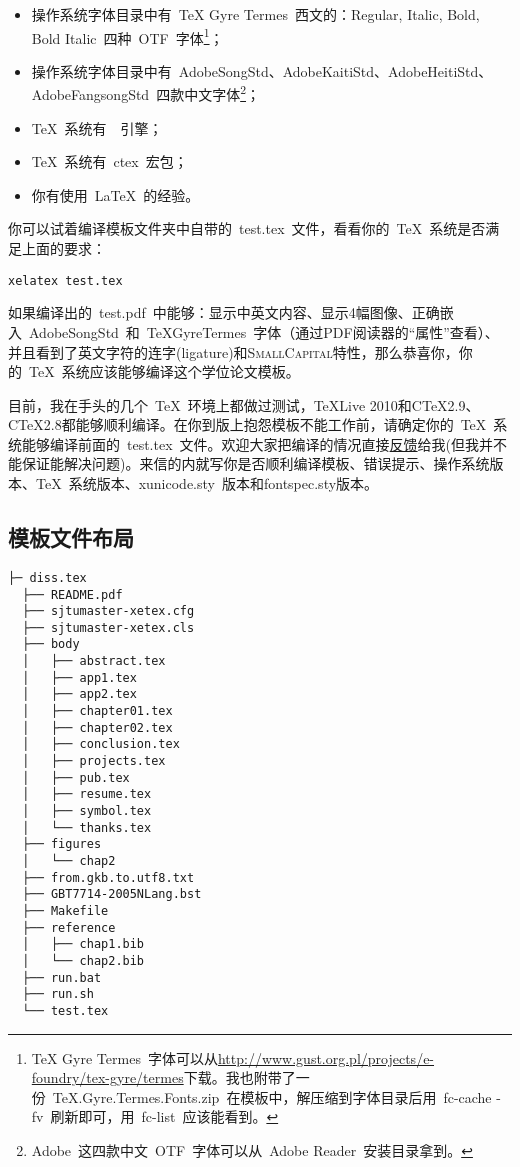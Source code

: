 \begin{itemize}
\item 操作系统字体目录中有~TeX Gyre Termes~西文的：Regular, Italic, Bold, Bold Italic~四种~OTF~字体\footnote{TeX Gyre Termes~字体可以从\href{http://www.gust.org.pl/projects/e-foundry/tex-gyre/termes}{http://www.gust.org.pl/projects/e-foundry/tex-gyre/termes}下载。我也附带了一份~TeX.Gyre.Termes.Fonts.zip~在模板中，解压缩到字体目录后用~fc-cache -fv~刷新即可，用~fc-list~应该能看到。}；
\item 操作系统字体目录中有~AdobeSongStd、AdobeKaitiStd、AdobeHeitiStd、AdobeFangsongStd~四款中文字体\footnote{Adobe~这四款中文~OTF~字体可以从~Adobe Reader~安装目录拿到。}；
\item \TeX~系统有~\XeTeX~引擎；
\item \TeX~系统有~ctex~宏包；
\item 你有使用~\LaTeX~的经验。
\end{itemize}

你可以试着编译模板文件夹中自带的~test.tex~文件，看看你的~\TeX~系统是否满足上面的要求：

\begin{verbatim}
xelatex test.tex
\end{verbatim}

如果编译出的~test.pdf~中能够：显示中英文内容、显示4幅图像、正确嵌入~AdobeSongStd~和~TeXGyreTermes~字体（通过PDF阅读器的“属性”查看）、并且看到了英文字符的连字(ligature)和\textsc{SmallCapital}特性，那么恭喜你，你的~\TeX~系统应该能够编译这个学位论文模板。

目前，我在手头的几个~\TeX~环境上都做过测试，TeXLive 2010和C\TeX 2.9、C\TeX 2.8都能够顺利编译。在你到版上抱怨模板不能工作前，请确定你的~\TeX~系统能够编译前面的~test.tex~文件。欢迎大家把编译的情况直接\href{mailto:wei.jianwen@gmail.com}{反馈}给我(但我并不能保证能解决问题)。来信的内就写你是否顺利编译模板、错误提示、操作系统版本、\TeX~系统版本、xunicode.sty~版本和fontspec.sty版本。
 
\subsection{模板文件布局}
\label{sec:layout}

\begin{lstlisting}[basicstyle=\small\ttfamily,caption={模板文件布局},label=layout,float,numbers=none]
  ├─ diss.tex
  ├── README.pdf
  ├── sjtumaster-xetex.cfg
  ├── sjtumaster-xetex.cls
  ├── body
  │   ├── abstract.tex
  │   ├── app1.tex
  │   ├── app2.tex
  │   ├── chapter01.tex
  │   ├── chapter02.tex
  │   ├── conclusion.tex
  │   ├── projects.tex
  │   ├── pub.tex
  │   ├── resume.tex
  │   ├── symbol.tex
  │   └── thanks.tex
  ├── figures
  │   └── chap2
  ├── from.gkb.to.utf8.txt
  ├── GBT7714-2005NLang.bst
  ├── Makefile
  ├── reference
  │   ├── chap1.bib
  │   └── chap2.bib
  ├── run.bat
  ├── run.sh
  └── test.tex
\end{lstlisting}

